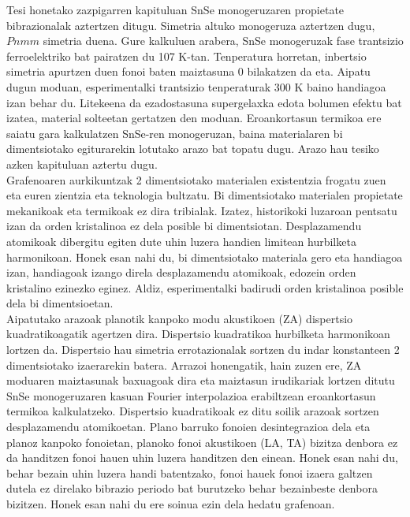 Tesi honetako zazpigarren kapituluan SnSe monogeruzaren propietate bibrazionalak aztertzen ditugu. Simetria altuko 
monogeruza aztertzen dugu, $Pnmm$ simetria duena. Gure kalkuluen arabera, SnSe monogeruzak fase trantsizio 
ferroelektriko bat pairatzen du 107 K-tan. Tenperatura horretan, inbertsio simetria apurtzen duen fonoi baten 
maiztasuna 0 bilakatzen da eta. Aipatu dugun moduan, esperimentalki trantsizio tenperaturak 300 K baino handiagoa 
izan behar du. Litekeena da ezadostasuna supergelaxka edota bolumen efektu bat izatea, material solteetan gertatzen 
den moduan. Eroankortasun termikoa ere saiatu gara kalkulatzen SnSe-ren monogeruzan, baina materialaren bi 
dimentsiotako egiturarekin lotutako arazo bat topatu dugu. Arazo hau tesiko azken kapituluan aztertu dugu. \\

Grafenoaren aurkikuntzak\cite{novoselov2004electric,novoselov2005two,novoselov2005twoo,zhang2005experimental} 2 
dimentsiotako materialen existentzia frogatu zuen eta euren zientzia eta teknologia bultzatu. Bi dimentsiotako 
materialen propietate mekanikoak eta termikoak ez dira tribialak. Izatez, historikoki luzaroan pentsatu izan da 
orden kristalinoa ez dela posible bi dimentsiotan\cite{landau_statistical_physics,mermin1968crystalline}. 
Desplazamendu atomikoak dibergitu egiten dute uhin luzera handien limitean hurbilketa harmonikoan. Honek esan nahi 
du, bi dimentsiotako materiala gero eta handiagoa izan, handiagoak izango direla desplazamendu atomikoak, edozein 
orden kristalino ezinezko eginez. Aldiz, esperimentalki badirudi orden kristalinoa posible dela bi dimentsioetan. \\

Aipatutako arazoak planotik kanpoko modu akustikoen (ZA) dispertsio kuadratikoagatik agertzen dira. Dispertsio 
kuadratikoa hurbilketa harmonikoan lortzen da. Dispertsio hau simetria errotazionalak sortzen du indar konstanteen 
2 dimentsiotako izaerarekin batera. Arrazoi honengatik, hain zuzen ere, ZA moduaren maiztasunak baxuagoak dira eta 
maiztasun irudikariak lortzen ditutu SnSe monogeruzaren kasuan Fourier interpolazioa erabiltzean eroankortasun 
termikoa kalkulatzeko. Dispertsio kuadratikoak ez ditu soilik arazoak sortzen desplazamendu atomikoetan. Plano 
barruko fonoien desintegrazioa dela eta planoz kanpoko fonoietan, planoko fonoi akustikoen (LA, TA) bizitza denbora 
ez da handitzen fonoi hauen uhin luzera handitzen den einean\cite{bonini2012acoustic}. Honek esan nahi du, behar 
bezain uhin luzera handi batentzako, fonoi hauek fonoi izaera galtzen dutela ez direlako bibrazio periodo bat 
burutzeko behar bezainbeste denbora bizitzen. Honek esan nahi du ere soinua ezin dela hedatu grafenoan. \\

